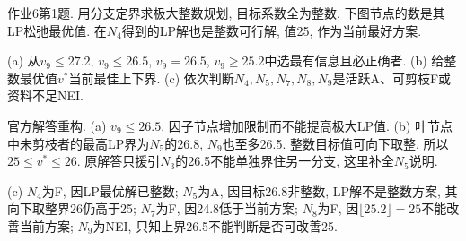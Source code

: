 \begin{exercise}\label{ass:15053-ps6-q1}
作业6第1题. 用分支定界求极大整数规划, 目标系数全为整数. 下图节点的数是其LP松弛最优值. 在$N_4$得到的LP解也是整数可行解, 值25, 作为当前最好方案.
\begin{center}\end{center}
(a) 从$v_9\le27.2$, $v_9\le26.5$, $v_9=26.5$, $v_9\ge25.2$中选最有信息且必正确者. (b) 给整数最优值$v^*$当前最佳上下界. (c) 依次判断$N_4,N_5,N_7,N_8,N_9$是活跃A、可剪枝F或资料不足NEI.
\end{exercise}
\begin{solution}
官方解答重构. (a) $v_9\le26.5$, 因子节点增加限制而不能提高极大LP值. (b) 叶节点中未剪枝者的最高LP界为$N_5$的26.8, $N_9$也至多26.5. 整数目标值可向下取整, 所以$25\le v^*\le26$. 原解答只援引$N_3$的26.5不能单独界住另一分支, 这里补全$N_5$说明.

(c) $N_4$为F, 因LP最优解已整数; $N_5$为A, 因目标26.8非整数, LP解不是整数方案, 其向下取整界26仍高于25; $N_7$为F, 因24.8低于当前方案; $N_8$为F, 因$\lfloor25.2\rfloor=25$不能改善当前方案; $N_9$为NEI, 只知上界26.5不能判断是否可改善25.
\end{solution}

